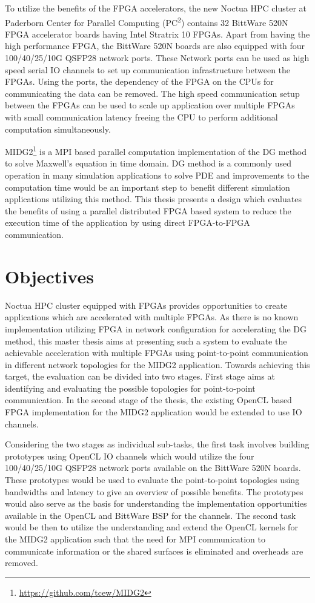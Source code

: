 To utilize the benefits of the FPGA accelerators, the new Noctua \ac{HPC} cluster at Paderborn Center for
Parallel Computing (PC\textsuperscript{2}) contains 32 BittWare 520N
FPGA accelerator boards having Intel Stratrix 10 FPGAs. Apart from having the high performance FPGA, the BittWare 520N boards
are also equipped with four 100/40/25/10G QSFP28 network ports. These Network ports can be used as
high speed serial IO channels to set up communication infrastructure between the FPGAs.
Using the ports, the dependency of the FPGA on the CPUs for communicating
the data can be removed. The high speed communication setup between the FPGAs can be used to scale
up application over multiple FPGAs with small communication latency freeing the CPU
to perform additional computation simultaneously.

MIDG2\footnote{\url{https://github.com/tcew/MIDG2}} is a \ac{MPI} based parallel computation
implementation of the \ac{DG} \cite{hesthaven_nodal_2008} method to solve Maxwell’s equation
in time domain. \ac{DG} method is a commonly used operation in many simulation applications to
solve \ac{PDE} and improvements to the computation time would be an important step to
benefit different simulation applications utilizing this method. This thesis presents
a design which evaluates the benefits of using a parallel distributed FPGA based system
to reduce the execution time of the application by using direct FPGA-to-FPGA communication.

\section{Objectives}

Noctua \ac{HPC} cluster equipped with FPGAs provides opportunities to create applications
which are accelerated with multiple FPGAs. As there is
no known implementation utilizing FPGA in network configuration for accelerating the
DG method, this master thesis aims at presenting such a system to evaluate
the achievable acceleration with multiple FPGAs using point-to-point communication in
different network topologies for the MIDG2 application. Towards achieving this target,
the evaluation can be divided into two stages. First stage aims at identifying
and evaluating the possible topologies for point-to-point communication. In the second
stage of the thesis, the existing OpenCL based FPGA implementation for
the MIDG2 application would be extended to use IO channels.

Considering the two stages as individual sub-tasks, the first task involves building
prototypes using OpenCL IO channels which would utilize the four 100/40/25/10G QSFP28
network ports available on the BittWare 520N boards. These prototypes would be used
to evaluate the point-to-point topologies using bandwidths and latency to give an
overview of possible benefits. The prototypes would also serve as the basis for
understanding the implementation opportunities available in the OpenCL and
BittWare BSP for the channels. The second task would be then to utilize the
understanding and extend the OpenCL kernels for the MIDG2 application
such that the need for \ac{MPI} communication to communicate information or the shared
surfaces is eliminated and overheads are removed.

